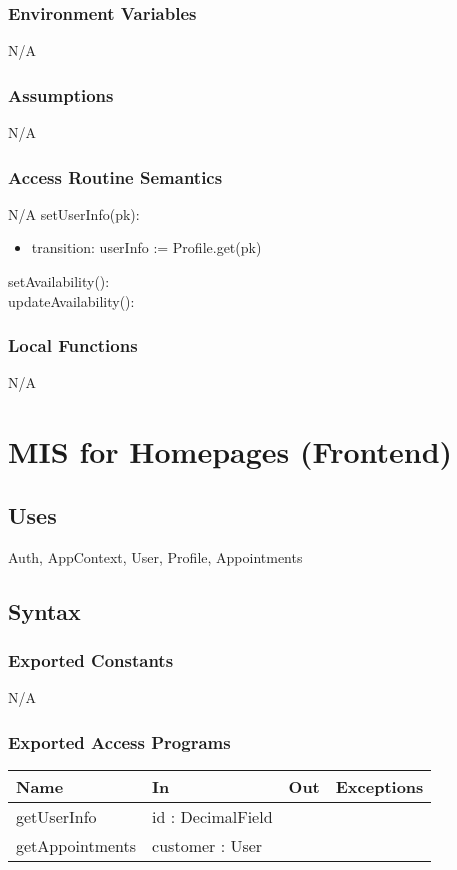 \documentclass[12pt, titlepage]{article}
\begin{document}
        \subsubsection{Environment Variables}
        N/A
        \subsubsection{Assumptions}
        N/A
        \subsubsection{Access Routine Semantics}
        N/A
            \noindent setUserInfo(pk):
            \begin{itemize}
                \item transition: userInfo := Profile.get(pk)
            \end{itemize}
            \noindent setAvailability(): \\
            \noindent updateAvailability():
        \subsubsection{Local Functions}
        N/A

\newpage
\section{MIS for Homepages (Frontend)}
    \subsection{Uses}
        Auth, AppContext, User, Profile, Appointments
    \subsection{Syntax}
        \subsubsection{Exported Constants}
        N/A
        \subsubsection{Exported Access Programs}
            \begin{center}
                \begin{tabular}{p{2.5cm} p{4cm} p{4cm} p{3cm}}
                    \toprule
                    \textbf{Name} & \textbf{In} & \textbf{Out} & \textbf{Exceptions} \\
                    \midrule
                    getUserInfo & id : DecimalField & & \\
                    getAppointments & customer : User & & \\
                    \bottomrule
                \end{tabular}
            \end{center}
\end{document}
